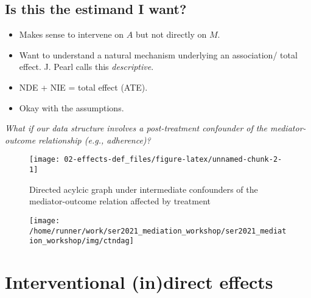 \documentclass[
  12pt,
]{book}
\providecommand{\tightlist}{%
  \setlength{\itemsep}{0pt}\setlength{\parskip}{0pt}}
\theoremstyle{definition}
\theoremstyle{definition}
\theoremstyle{definition}
\newcommand{\1}{\mathbbm{1}}
\begin{document}
\hypertarget{is-this-the-estimand-i-want-1}{%
\subsection{Is this the estimand I want?}\label{is-this-the-estimand-i-want-1}}

\begin{itemize}
\tightlist
\item
  Makes sense to intervene on \(A\) but not directly on \(M\).
\item
  Want to understand a natural mechanism underlying an association/ total
  effect. J. Pearl calls this \emph{descriptive}.
\item
  NDE + NIE = total effect (ATE).
\item
  Okay with the assumptions.
\end{itemize}

\emph{What if our data structure involves a post-treatment confounder of the
mediator-outcome relationship (e.g., adherence)?}

\begin{figure}

{\centering \texttt{[image: 02-effects-def\_files/figure-latex/unnamed-chunk-2-1]} 

}

\caption{Directed acylcic graph under intermediate confounders of the mediator-outcome relation affected by treatment}\label{fig:unnamed-chunk-2}
\end{figure}

\begin{figure}

{\centering \texttt{[image: /home/runner/work/ser2021\_mediation\_workshop/ser2021\_mediation\_workshop/img/ctndag]} 

}

\end{figure}

\hypertarget{interventional-indirect-effects}{%
\section{Interventional (in)direct effects}\label{interventional-indirect-effects}}
\end{document}
